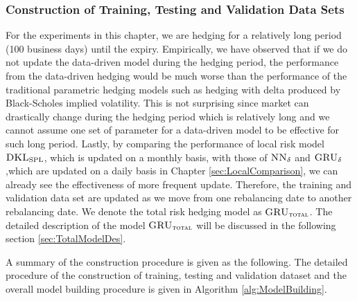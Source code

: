 \documentclass[letterpaper,12pt,titlepage,oneside,final]{book}
\numberwithin{equation}{section}
\theoremstyle{definition}
\newcommand{\model}{\textsc{GRU}_\delta}
\newcommand{\modelT}{\textsc{GRU}_{\textsc{total}}}
\newcommand{\modelN}{\textsc{NN}_\delta}
\newcommand{\DKLs}{\bf\textsc{DKL}_{\text{SPL}}}
\begin{document}
\subsubsection{Construction of Training, Testing and Validation Data Sets}
For the experiments in this chapter, we are hedging for a relatively long period (100 business days) until the expiry.  Empirically, we have observed that if we do not update the data-driven model during the hedging period, the performance from the data-driven hedging would be much worse than the performance of the traditional parametric hedging models such as hedging with delta produced by Black-Scholes implied volatility. This is not surprising since market can drastically change during the hedging period which is relatively long and we cannot assume one set of parameter for a data-driven model to be effective for such long period. Lastly, by comparing the performance of local risk model  $\DKLs$, which is updated on a monthly basis,  with those of $\modelN$ and $\model$ ,which are updated on a daily basis in Chapter \ref{sec:LocalComparison}, we can already see the effectiveness of more frequent update.  Therefore, the training and validation data set are updated as we move from one rebalancing date to another rebalancing date. We denote the total risk hedging model as $\modelT$. The detailed description of the model $\modelT$ will be discussed in the following section \ref{sec:TotalModelDes}.

A summary of the construction procedure is given as the following. The detailed procedure of the construction of  training, testing and validation dataset and the overall model building procedure is given in Algorithm \ref{alg:ModelBuilding}.
\end{document}
